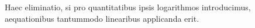 \expandafter\def\csname HistoricalNoteText17\endcsname{Haec eliminatio, si pro
quantitatibus ipsis logarithmos introducimus, aequationibus tantummodo
linearibus applicanda erit.}
